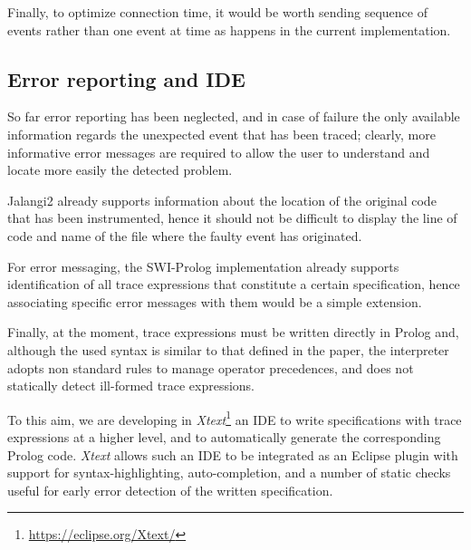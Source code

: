 Finally, to optimize connection time, it would be worth sending sequence of events rather than one
event at time as happens in the current implementation.

\subsection{Error reporting and IDE}
So far error reporting has been neglected, and in case of failure the only available information
regards the unexpected event that has been traced; clearly, more informative error messages
are required to allow the user to understand and locate more easily the detected problem.

Jalangi2 already supports information about the location of the original code that has been
instrumented, hence it should not be difficult to display the line of code and name of the file where
the faulty event has originated.

For error messaging, the SWI-Prolog implementation already supports identification of
all trace expressions that constitute a certain specification, hence associating specific error messages with them
would be a simple extension.

Finally, at the moment, trace expressions must be written directly in Prolog and, although the used syntax
is similar to that defined in the paper, the interpreter adopts non standard rules to manage operator precedences,
and does not statically detect ill-formed trace expressions.

To this aim, we are developing in \textit{Xtext}\footnote{\url{https://eclipse.org/Xtext/}} an IDE
to write specifications with trace expressions at a higher level, and to automatically generate
the corresponding Prolog code. \textit{Xtext} allows such an IDE to be integrated as an Eclipse plugin
with support for syntax-highlighting, auto-completion,
and a number of static checks useful for early error detection of the written specification.
